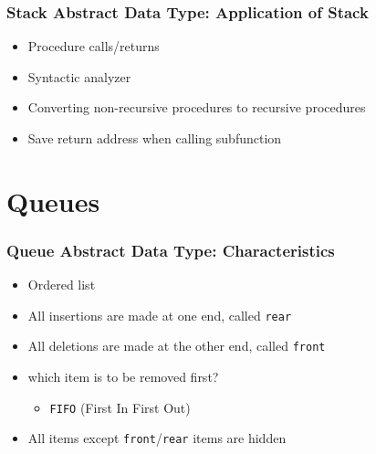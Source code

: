 \documentclass[newPxFont,sthlmFooter,nooffset]{beamer}
\begin{document}
\begin{frame}[t]
  \frametitle{Stack Abstract Data Type: Application of Stack}
  \begin{itemize}
  \item Procedure calls/returns
  \item Syntactic analyzer
  \item Converting non-recursive procedures to recursive procedures
  \item Save return address when calling subfunction
  \end{itemize}
\end{frame}




\section{Queues} 
\begin{frame}[t]
  \frametitle{Queue Abstract Data Type: Characteristics}
  \begin{itemize}
  \item Ordered list
  \item All insertions are made at one end, called \texttt{rear}
  \item All deletions are made at the other end, called \texttt{front}
  \item which item is to be removed first?
    \begin{itemize}
    \item \texttt{FIFO} (First In First Out)
    \end{itemize}
  \item All items except \texttt{front}/\texttt{rear} items are hidden
  \end{itemize}
\end{frame}
\end{document}
